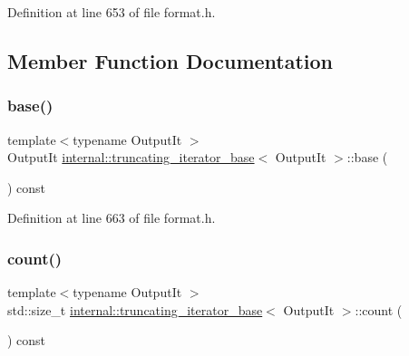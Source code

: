 Definition at line 653 of file format.\+h.



\subsection{Member Function Documentation}
\mbox{\label{classinternal_1_1truncating__iterator__base_a9448497520d8f10cee98ce6c41a57d70}} 
\subsubsection{\texorpdfstring{base()}{base()}}
{\footnotesize\ttfamily template$<$typename Output\+It $>$ \\
Output\+It \hyperlink{classinternal_1_1truncating__iterator__base}{internal\+::truncating\+\_\+iterator\+\_\+base}$<$ Output\+It $>$\+::base (\begin{DoxyParamCaption}{ }\end{DoxyParamCaption}) const\hspace{0.3cm}{\ttfamily [inline]}}



Definition at line 663 of file format.\+h.

\mbox{\label{classinternal_1_1truncating__iterator__base_a14dfca041b5ab9ab7e8a6f35fef06a5b}} 
\subsubsection{\texorpdfstring{count()}{count()}}
{\footnotesize\ttfamily template$<$typename Output\+It $>$ \\
std\+::size\+\_\+t \hyperlink{classinternal_1_1truncating__iterator__base}{internal\+::truncating\+\_\+iterator\+\_\+base}$<$ Output\+It $>$\+::count (\begin{DoxyParamCaption}{ }\end{DoxyParamCaption}) const\hspace{0.3cm}{\ttfamily [inline]}}



